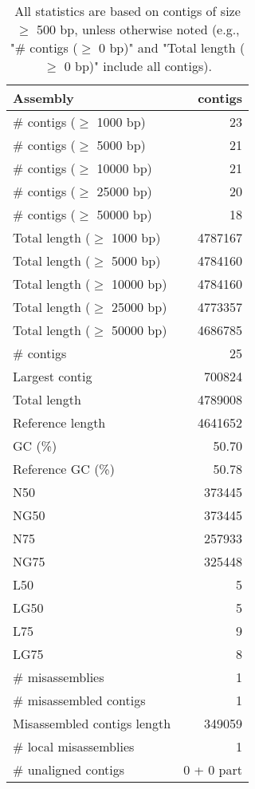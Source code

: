 \documentclass[12pt,a4paper]{article}
\begin{document}
\begin{table}[ht]
\begin{center}
\caption{All statistics are based on contigs of size $\geq$ 500 bp, unless otherwise noted (e.g., "\# contigs ($\geq$ 0 bp)" and "Total length ($\geq$ 0 bp)" include all contigs).}
\begin{tabular}{|l*{1}{|r}|}
\hline
Assembly & contigs \\ \hline
\# contigs ($\geq$ 1000 bp) & 23 \\ \hline
\# contigs ($\geq$ 5000 bp) & 21 \\ \hline
\# contigs ($\geq$ 10000 bp) & 21 \\ \hline
\# contigs ($\geq$ 25000 bp) & 20 \\ \hline
\# contigs ($\geq$ 50000 bp) & 18 \\ \hline
Total length ($\geq$ 1000 bp) & 4787167 \\ \hline
Total length ($\geq$ 5000 bp) & 4784160 \\ \hline
Total length ($\geq$ 10000 bp) & 4784160 \\ \hline
Total length ($\geq$ 25000 bp) & 4773357 \\ \hline
Total length ($\geq$ 50000 bp) & 4686785 \\ \hline
\# contigs & 25 \\ \hline
Largest contig & 700824 \\ \hline
Total length & 4789008 \\ \hline
Reference length & 4641652 \\ \hline
GC (\%) & 50.70 \\ \hline
Reference GC (\%) & 50.78 \\ \hline
N50 & 373445 \\ \hline
NG50 & 373445 \\ \hline
N75 & 257933 \\ \hline
NG75 & 325448 \\ \hline
L50 & 5 \\ \hline
LG50 & 5 \\ \hline
L75 & 9 \\ \hline
LG75 & 8 \\ \hline
\# misassemblies & 1 \\ \hline
\# misassembled contigs & 1 \\ \hline
Misassembled contigs length & 349059 \\ \hline
\# local misassemblies & 1 \\ \hline
\# unaligned contigs & 0 + 0 part \\ \hline

\end{tabular}
\end{center}
\end{table}
\end{document}

